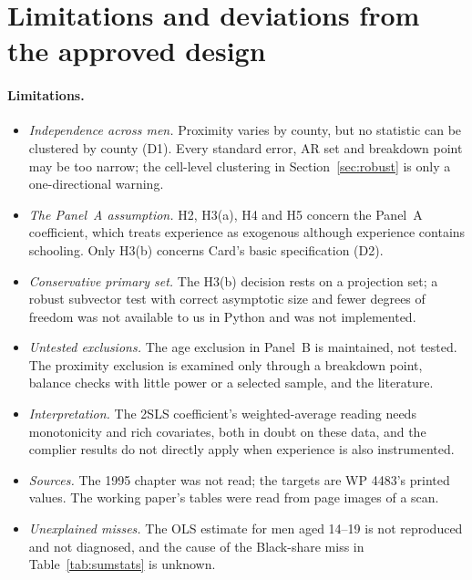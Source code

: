 \documentclass[11pt]{article}
\begin{document}
\section*{Limitations and deviations from the approved design}
\label{sec:deviations}

\paragraph{Limitations.}
\begin{itemize}
\item \emph{Independence across men.} Proximity varies by county, but no statistic can be
clustered by county (D1). Every standard error, AR set and breakdown point may be too
narrow; the cell-level clustering in Section~\ref{sec:robust} is only a one-directional
warning.
\item \emph{The Panel~A assumption.} H2, H3(a), H4 and H5 concern the Panel~A coefficient,
which treats experience as exogenous although experience contains schooling. Only H3(b)
concerns Card's basic specification (D2).
\item \emph{Conservative primary set.} The H3(b) decision rests on a projection set; a
robust subvector test with correct asymptotic size and fewer degrees of freedom was not
available to us in Python and was not implemented.
\item \emph{Untested exclusions.} The age exclusion in Panel~B is maintained, not tested.
The proximity exclusion is examined only through a breakdown point, balance checks with
little power or a selected sample, and the literature.
\item \emph{Interpretation.} The 2SLS coefficient's weighted-average reading needs
monotonicity and rich covariates, both in doubt on these data, and the complier results do
not directly apply when experience is also instrumented.
\item \emph{Sources.} The 1995 chapter was not read; the targets are WP 4483's printed
values. The working paper's tables were read from page images of a scan.
\item \emph{Unexplained misses.} The OLS estimate for men aged 14--19 is not reproduced
and not diagnosed, and the cause of the Black-share miss in Table~\ref{tab:sumstats} is
unknown.
\end{itemize}
\end{document}
